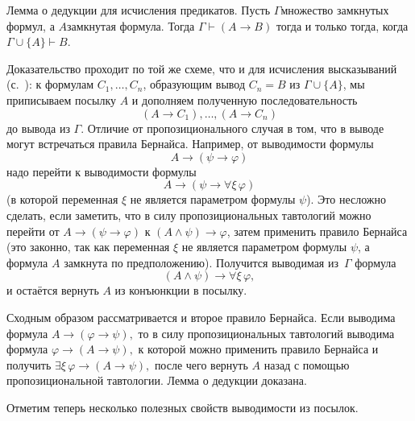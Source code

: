 \textsf{Лемма о дедукции для исчисления
предикатов.}\label{deduction-predicate}
Пусть $\Gamma$\т множество замкнутых формул, а $A$\т замкнутая
формула. Тогда $\Gamma \vdash (A\to B)$ тогда и только тогда,
когда $\Gamma\cup\{A\} \vdash B$.

Доказательство проходит по той же схеме, что и для исчисления
высказываний (с.~\pageref{deduction-lemma}): к формулам
$C_1,\dots,C_n$, образующим вывод $C_n=B$ из $\Gamma\cup\{A\}$,
мы приписываем посылку $A$ и дополняем полученную последовательность
        $$
(A\to C_1),\dots,(A\to C_n)
        $$
до вывода из $\Gamma$. Отличие от пропозиционального случая в том,
что в выводе могут встречаться правила Бернайса. Например,
от выводимости формулы
        $$A\to(\psi\to\varphi)$$
надо перейти к выводимости формулы
        $$A\to(\psi\to\forall\xi\,\varphi)$$
(в которой переменная $\xi$ не является параметром формулы
$\psi$). Это несложно сделать, если заметить, что в силу
пропозициональных тавтологий можно перейти от
$A\to(\psi\to\varphi)$ к $(A\land\psi)\to\varphi$, затем
применить правило Бернайса (это законно, так как переменная
$\xi$ не является параметром формулы $\psi$, а формула $A$
замкнута по предположению). Получится выводимая из~$\Gamma$
формула
        $$(A\land\psi)\to\forall\xi\,\varphi,$$
и остаётся вернуть $A$ из конъюнкции в
посылку.

Сходным образом рассматривается и второе правило Бернайса. Если
выводима формула
        $A\to(\varphi\to\psi),$
то в силу пропозициональных тавтологий выводима формула
        $\varphi\to(A\to\psi),$
к которой можно применить правило Бернайса и получить
        $\exists\xi\,\varphi\to(A\to\psi),$
после чего вернуть $A$ назад с помощью пропозициональной
тавтологии. Лемма о дедукции доказана.

Отметим теперь несколько полезных свойств выводимости из посылок.

